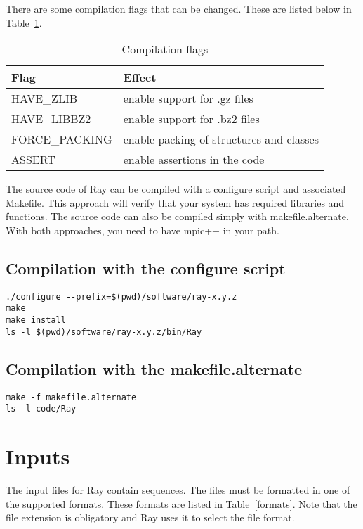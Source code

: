 \documentclass{article}
\begin{document}
There are some compilation flags that can be changed. These are listed below in Table~\ref{flags}.


\begin{table}[h]
\caption{Compilation flags}\label{flags}
\begin{tabular}{ll}
\hline
Flag & Effect  \\
\hline
HAVE\_ZLIB & enable support for .gz files \\
HAVE\_LIBBZ2 & enable support for .bz2 files \\
FORCE\_PACKING & enable packing of structures and classes\\
ASSERT & enable assertions in the code \\
\hline
\end{tabular}
\end{table}

The source code of Ray can be compiled with a configure script and associated Makefile.
This approach will verify that your system has required libraries and functions.
The source code can also be compiled simply with makefile.alternate.
With both approaches, you need to have mpic++ in your path. 



\subsection{Compilation with the configure script}



\begin{verbatim}
./configure --prefix=$(pwd)/software/ray-x.y.z
make
make install
ls -l $(pwd)/software/ray-x.y.z/bin/Ray
\end{verbatim}


\subsection{Compilation with the makefile.alternate}

\begin{verbatim}
make -f makefile.alternate
ls -l code/Ray
\end{verbatim}

\section{Inputs}

The input files for Ray contain sequences. The files must be formatted in one of the supported formats.
These formats are listed in Table~\ref{formats}. Note that the file extension is obligatory and Ray uses it
to select the file format.
\end{document}
